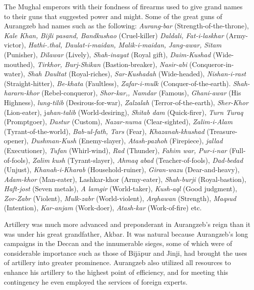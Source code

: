 The Mughal emperors with their fondness of firearms used to give grand names to their guns that suggested power and might. Some of the great guns of Aurangzeb had names such as the follow­ing: \textit{Aurang-bar }(Strength-of-the-throne), \textit{Kale Khan, Bijli pasand, Band­kushao }(Cruel-killer) \textit{Daldali, Fat-i-laskhar }(Army-victor), \textit{Hathi-.thal, Daulat-i-maidan, Malik-i-maidan, Jang-awar, Sitam }(Punisher), \textit{Dilawar }(Lively), \textit{Shah-inayat }(Royal gift), \textit{Daim-Kushad }(Wide-mouthed), \textit{Tir­khor, Burj-Shikan }(Bastion-breaker), \textit{Nasir-abi }(Conqueror-in-water), \textit{Shah Daultat }(Royal-riches), \textit{Sar-Kushadah }(Wide-headed), \textit{Nishan-i­-rast }(Straight-hitter), \textit{Be-khata }(Faultless), \textit{Zafar-i-mulk }(Conquer-of­-the-earth). \textit{Shah-hararn-khor }(Rebel-conqueror), \textit{Shor-kar,, Namdar }(Famous), \textit{Ghani-awar }(His Highness), \textit{lung-tilib }(Desirous-for-war), \textit{Zalzalah }(Terror-of-the-earth), \textit{Sher-Khor }(Lion-eater), j\textit{ahan-talib }(World-desiring), \textit{Shitab dam }(Quick-firer), \textit{Turn Turaq }(Prompt­goer), \textit{Dastur }(Custom), \textit{Nazar-numa }(Clear-sighted), \textit{Zalim-i-Alam }(Tyrant-of-the-world), \textit{Bab-ul-fath, Tars }(Fear), \textit{Khazanah-khushad }(Treasure-opener), \textit{Dushman-Kush }(Enemy-slayer), \textit{Atash-pazhoh }(Fire­piece), \textit{jallad }(Executioner), \textit{Tufan }(Whirl-wind), \textit{Rad }(Thunder), \textit{Fahim war, Pur-i-nar }(Full-of-fools), \textit{Zalim kush }(Tyrant-slayer), \textit{Ahmaq abad }(Teacher-of-fools), \textit{Dad-bedad }(Unjust), \textit{Khanah-i-Kharab }(Household-ruiner), \textit{Giran-wazu }(Dear-and-heavy), \textit{Adam-khor }(Man-eater), Lashkar-khor (Army-eater), \textit{Shah-burji }(Royal-bastion), \textit{Haft-jost }(Seven metals), \textit{A lamgir }(World-taker), \textit{Kush-aql }(Good­ judgment), \textit{Zor-Zabr }(Violent), \textit{Mulk-zabr }(World-violent), \textit{Arghawan }(Strength), \textit{Maqsud }(Intention), \textit{Kar-anjam }(Work-doer), \textit{Atash-kar }(Work-of-fire) etc.

Artillery was much more advanced and preponderant in Aurangzeb's reign than it was under his great grandfather, Akbar. It was natural because Aurangzeb's long campaigns in the Deccan and the innumer­able sieges, some of which were of considerable importance such as those of Bijāpur and Jinji, had brought the uses of artillery into greater prominence. Aurangzeb also utilized all resources to enhance his artillery to the highest point of efficiency, and for meeting this contingency he even employed the services of foreign experts.

